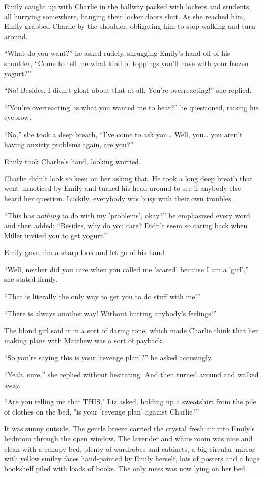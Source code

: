 Emily caught up with Charlie in the hallway packed with lockers and students, all hurrying somewhere, banging their locker doors shut. As she reached him, Emily grabbed Charlie by the shoulder, obligating him to stop walking and turn around.

“What do you want?” he asked rudely, shrugging Emily's hand off of his shoulder, “Come to tell me what kind of toppings you'll have with your frozen yogurt?”

“No! Besides, I didn't gloat about that at all. You're overreacting!” she replied.

“'You're overreacting' is what you wanted me to hear?” he questioned, raising his eyebrow.

“No,” she took a deep breath, “I've come to ask you… Well, you… you aren't having anxiety problems again, are you?”

Emily took Charlie's hand, looking worried.

Charlie didn't look so keen on her asking that. He took a long deep breath that went unnoticed by Emily and turned his head around to see if anybody else heard her question. Luckily, everybody was busy with their own troubles.

“This has \textit{nothing} to do with my 'problems', okay?” he emphasized every word and then added: “Besides, why do you care? Didn't seem so caring back when Miller invited you to get yogurt.”

Emily gave him a sharp look and let go of his hand.

“Well, neither did you care when you called me 'scared' because I am a 'girl',” she stated firmly.

“That is literally the only way to get you to do stuff with me!”

“There is always another way! Without hurting anybody's feelings!”

The blond girl said it in a sort of daring tone, which made Charlie think that her making plans with Matthew was a sort of payback.

“So you're saying this is your 'revenge plan'?” he asked accusingly.

“Yeah, sure,” she replied without hesitating. And then turned around and walked away.

\bigskip

“Are you telling me that THIS," Liz asked, holding up a sweatshirt from the pile of clothes on the bed, "is your 'revenge plan' against Charlie?”

It was sunny outside. The gentle breeze carried the crystal fresh air into Emily's bedroom through the open window. The lavender and white room was nice and clean with a canopy bed, plenty of wardrobes and cabinets, a big circular mirror with yellow smiley faces hand-painted by Emily herself, lots of posters and a huge bookshelf piled with loads of books. The only mess was now lying on her bed.

